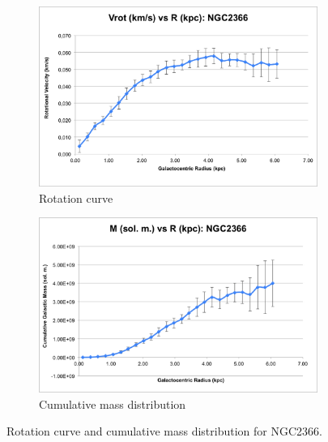 \documentclass{article}
\begin{document}
\begin{figure}
    \centering
    \begin{subfigure}{0.4\textwidth}
        \includegraphics[width=\textwidth]{vrot/Vrot-4}
        \caption{Rotation curve}
    \end{subfigure}
    \hfill
    \begin{subfigure}{0.4\textwidth}
        \includegraphics[width=\textwidth]{m/M-4}
        \caption{Cumulative mass distribution}
    \end{subfigure}
    \caption{Rotation curve and cumulative mass distribution for NGC2366.}
    \label{fig:ngc2366}
\end{figure}
\end{document}
